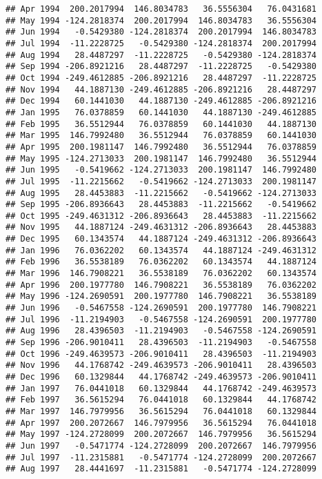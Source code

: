 \documentclass[]{article}
\begin{document}
\begin{verbatim}
## Apr 1994  200.2017994  146.8034783   36.5556304   76.0431681
## May 1994 -124.2818374  200.2017994  146.8034783   36.5556304
## Jun 1994   -0.5429380 -124.2818374  200.2017994  146.8034783
## Jul 1994  -11.2228725   -0.5429380 -124.2818374  200.2017994
## Aug 1994   28.4487297  -11.2228725   -0.5429380 -124.2818374
## Sep 1994 -206.8921216   28.4487297  -11.2228725   -0.5429380
## Oct 1994 -249.4612885 -206.8921216   28.4487297  -11.2228725
## Nov 1994   44.1887130 -249.4612885 -206.8921216   28.4487297
## Dec 1994   60.1441030   44.1887130 -249.4612885 -206.8921216
## Jan 1995   76.0378859   60.1441030   44.1887130 -249.4612885
## Feb 1995   36.5512944   76.0378859   60.1441030   44.1887130
## Mar 1995  146.7992480   36.5512944   76.0378859   60.1441030
## Apr 1995  200.1981147  146.7992480   36.5512944   76.0378859
## May 1995 -124.2713033  200.1981147  146.7992480   36.5512944
## Jun 1995   -0.5419662 -124.2713033  200.1981147  146.7992480
## Jul 1995  -11.2215662   -0.5419662 -124.2713033  200.1981147
## Aug 1995   28.4453883  -11.2215662   -0.5419662 -124.2713033
## Sep 1995 -206.8936643   28.4453883  -11.2215662   -0.5419662
## Oct 1995 -249.4631312 -206.8936643   28.4453883  -11.2215662
## Nov 1995   44.1887124 -249.4631312 -206.8936643   28.4453883
## Dec 1995   60.1343574   44.1887124 -249.4631312 -206.8936643
## Jan 1996   76.0362202   60.1343574   44.1887124 -249.4631312
## Feb 1996   36.5538189   76.0362202   60.1343574   44.1887124
## Mar 1996  146.7908221   36.5538189   76.0362202   60.1343574
## Apr 1996  200.1977780  146.7908221   36.5538189   76.0362202
## May 1996 -124.2690591  200.1977780  146.7908221   36.5538189
## Jun 1996   -0.5467558 -124.2690591  200.1977780  146.7908221
## Jul 1996  -11.2194903   -0.5467558 -124.2690591  200.1977780
## Aug 1996   28.4396503  -11.2194903   -0.5467558 -124.2690591
## Sep 1996 -206.9010411   28.4396503  -11.2194903   -0.5467558
## Oct 1996 -249.4639573 -206.9010411   28.4396503  -11.2194903
## Nov 1996   44.1768742 -249.4639573 -206.9010411   28.4396503
## Dec 1996   60.1329844   44.1768742 -249.4639573 -206.9010411
## Jan 1997   76.0441018   60.1329844   44.1768742 -249.4639573
## Feb 1997   36.5615294   76.0441018   60.1329844   44.1768742
## Mar 1997  146.7979956   36.5615294   76.0441018   60.1329844
## Apr 1997  200.2072667  146.7979956   36.5615294   76.0441018
## May 1997 -124.2728099  200.2072667  146.7979956   36.5615294
## Jun 1997   -0.5471774 -124.2728099  200.2072667  146.7979956
## Jul 1997  -11.2315881   -0.5471774 -124.2728099  200.2072667
## Aug 1997   28.4441697  -11.2315881   -0.5471774 -124.2728099

\end{verbatim}
\end{document}
